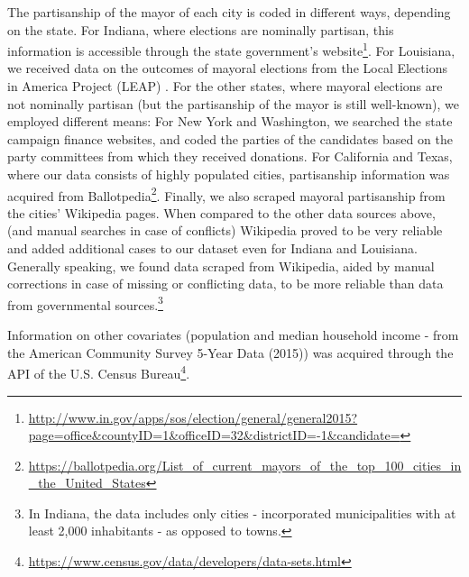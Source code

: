 \documentclass[11pt]{article}
\begin{document}
The partisanship of the mayor of each city is coded in different ways, depending on the state. For Indiana, where elections are nominally partisan, this information is accessible through the state government's website\footnote{\url{http://www.in.gov/apps/sos/election/general/general2015?page=office&countyID=1&officeID=32&districtID=-1&candidate=}}. For Louisiana, we received data on the outcomes of mayoral elections from the Local Elections in America Project (LEAP) \citep{marschall2013local}. For the other states, where mayoral elections are not nominally partisan (but the partisanship of the mayor is still well-known), we employed different means: For New York and Washington, we searched the state campaign finance websites, and coded the parties of the candidates based on the party committees from which they received donations. For California and Texas, where our data consists of highly populated cities, partisanship information was acquired from Ballotpedia\footnote{\url{https://ballotpedia.org/List_of_current_mayors_of_the_top_100_cities_in_the_United_States}}. Finally, we also scraped mayoral partisanship from the cities' Wikipedia pages. When compared to the other data sources above, (and manual searches in case of conflicts) Wikipedia proved to be very reliable and added additional cases to our dataset even for Indiana and Louisiana. Generally speaking, we found data scraped from Wikipedia, aided by manual corrections in case of missing or conflicting data, to be more reliable than data from governmental sources.\footnote{In Indiana, the data includes only cities - incorporated municipalities with at least 2,000 inhabitants - as opposed to towns.}


Information on other covariates (population and median household income - from the American Community Survey 5-Year Data (2015)) was acquired through the API of the U.S. Census Bureau\footnote{\url{https://www.census.gov/data/developers/data-sets.html}}.

\end{document}
